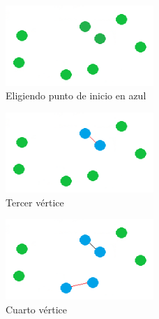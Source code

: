 \begin{frame}
	\begin{exampleblock}{ }
	\begin{figure}[htbH] 
		\centering
		\includegraphics[width=0.5\textwidth]{./Imagenes/arista1.png}
		\caption{Eligiendo punto de inicio en azul} 
	\end{figure}
	\end{exampleblock}
\end{frame}

\begin{frame}
	\begin{exampleblock}{ }
	\begin{figure}[htbH] 
		\centering
		\includegraphics[width=0.5\textwidth]{./Imagenes/arista2.png}
		\caption{Tercer vértice} 
	\end{figure}
	\end{exampleblock}
\end{frame}

\begin{frame}
	\begin{exampleblock}{ }
	\begin{figure}[htbH] 
		\centering
		\includegraphics[width=0.5\textwidth]{./Imagenes/arista3.png}
		\caption{Cuarto vértice} 
	\end{figure}
	\end{exampleblock}
\end{frame}	

